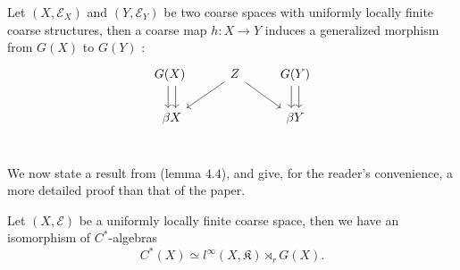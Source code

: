 \begin{prop}
Let $(X,\mathcal E_X)$ and $(Y,\mathcal E_Y)$ be two coarse spaces with uniformly locally finite coarse structures, then a coarse map $h :X\rightarrow Y$ induces a generalized morphism from $G(X)$ to $G(Y)$ :
\[\begin{tikzcd}
G(X)\arrow[xshift=-0.7ex]{d}\arrow[xshift=0.7ex]{d} \ & \arrow{dl} Z \arrow{dr} & G(Y)\arrow[xshift=-0.7ex]{d}\arrow[xshift=0.7ex]{d} \\
\beta X & &\beta Y \\
\end{tikzcd}\] 
\end{prop}

We now state a result from \cite{SkTuYu} (lemma $4.4$), and give, for the reader's convenience, a more detailed proof than that of the paper.\\

\begin{prop}
Let $(X,\mathcal E)$ be a uniformly locally finite coarse space, then we have an isomorphism of $C^*$-algebras
\[C^*(X) \simeq l^\infty(X,\mathfrak K) \rtimes_r G(X).\]
\end{prop}

